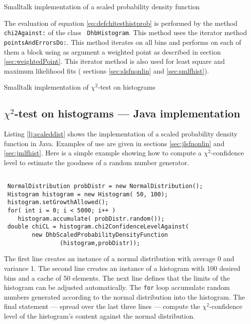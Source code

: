 \documentclass[twoside]{book}
\begin{document}
\begin{listing} Smalltalk implementation of a scaled
probability density function \label{ls:scaleddist}

\end{listing}

The evaluation of equation \ref{eq:defchitesthistprob} is
performed by the method {\tt chi2Against:} of the class {\tt
DhbHistogram}. This method uses the iterator method {\tt
pointsAndErrorsDo:}. This method iterates on all bins and performs
on each of them a block using as argument a weighted point as
described in section \ref{sec:weightedPoint}. This iterator method
is also used for least square and maximum likelihood fits (\cf
sections \ref{sec:slsfnonlin} and \ref{sec:smlfhist}).

\begin{listing} Smalltalk implementation of $\chi^2$-test on histograms \label{ls:chitesthist}

\end{listing}

\subsection{$\chi^2$-test on histograms --- Java implementation}
 Listing
\ref{lj:scaleddist} shows the implementation of a scaled
probability density function in Java. Examples of use are given in
sections \ref{sec:jlsfnonlin} and \ref{sec:jmlfhist}. Here is a
simple example showing how to compute a $\chi^2$-confidence level
to estimate the goodness of a random number generator.
\begin{codeExample}
\label{exj:chitest}
\begin{verbatim}

 NormalDistribution probDistr = new NormalDistribution();
 Histogram histogram = new Histogram( 50, 100);
 histogram.setGrowthAllowed();
 for( int i = 0; i < 5000; i++ )
    histogram.accumulate( probDistr.random());
 double chiCL = histogram.chi2ConfidenceLevelAgainst(
        new DhbScaledProbabilityDensityFunction
                (histogram,probDistr));
\end{verbatim}
\end{codeExample}
The first line creates an instance of a normal distribution with
average 0 and variance 1. The second line creates an instance of a
histogram with 100 desired bins and a cache of 50 elements. The
next line defines that the limits of the histogram can be adjusted
automatically. The {\tt for} loop accumulate random numbers
generated according to the normal distribution into the histogram.
The final statement --- spread over the last three lines ---
compute the $\chi^2$-confidence level of the histogram's content
against the normal distribution.
\end{document}
